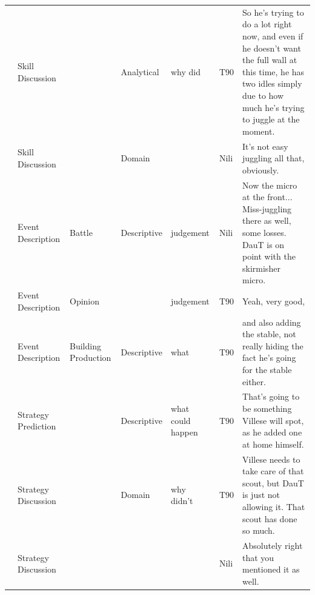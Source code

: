 {\begin{longtable}{@{}>{\theAppRow}r|L{2.3cm}L{2.2cm}L{1.4cm}L{2.2cm}L{0.5cm}U{5.6cm}@{}}
    & Skill Discussion      &                      & Analytical  & why did           & T90     & So he's trying to do a lot right now, and even if he doesn't want the full wall at this time, he has two idles simply due to how much he's trying to juggle at the moment.                                               \\
    & Skill Discussion      &                      & Domain      &                   & Nili    & It's not easy juggling all that, obviously.                                                                                                                                                                              \\
    & Event Description     & Battle               & Descriptive   & judgement         & Nili    & Now the micro at the front... Miss-juggling there as well, some losses. DauT is on point with the skirmisher micro.                                                                                                      \\
    & Event Description     & Opinion              &             & judgement         & T90     & Yeah, very good,                                                                                                                                                                                                         \\
    & Event Description     & Building Production  & Descriptive   & what              & T90     & and also adding the stable, not really hiding the fact he's going for the stable either.                                                                                                                                 \\
    & Strategy Prediction   &                      & Descriptive   & what could happen & T90     & That's going to be something Villese will spot, as he added one at home himself.                                                                                                                                         \\
    & Strategy Discussion   &                      & Domain      & why didn't        & T90     & Villese needs to take care of that scout, but DauT is just not allowing it. That scout has done so much.                                                                                                                 \\
    & Strategy Discussion   &                      &             &                   & Nili    & Absolutely right that you mentioned it as well.                                                                                                                                                                          \\

\end{longtable}}
